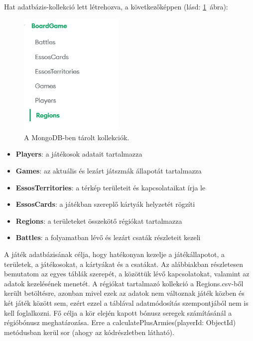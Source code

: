 \documentclass[
]{thesis-ekf}
\theoremstyle{definition}
\theoremstyle{remark}
\begin{document}
	
	
	Hat adatbázis-kollekció lett létrehozva, a következőképpen (lásd: \ref{collections}~ábra):
	
	\begin{figure}[ht!]
		\centering
		\includegraphics[width=5cm]{Collections.png}
		\caption{A MongoDB-ben tárolt kollekciók.}
		\label{collections}
	\end{figure}
	
	\begin{itemize}
		\item \textbf{Players}: a játékosok adatait tartalmazza
		\item \textbf{Games}: az aktuális és lezárt játszmák állapotát tartalmazza
		\item \textbf{EssosTerritories}: a térkép területeit és kapcsolataikat írja le
		\item \textbf{EssosCards}: a játékban szereplő kártyák helyzetét rögzíti
		\item \textbf{Regions}: a területeket összekötő régiókat tartalmazza
		\item \textbf{Battles}: a folyamatban lévő és lezárt csaták részleteit kezeli
	\end{itemize}
	
	A játék adatbázisának célja, hogy hatékonyan kezelje a játékállapotot, a területek, a játékosokat, a kártyákat és a csatákat. Az alábbiakban részletesen bemutatom az egyes táblák szerepét, a közöttük lévő kapcsolatokat, valamint az adatok kezelésének menetét. A régiókat tartalmazó kollekció a Regions.csv-ből került betöltésre, azonban mivel ezek az adatok nem változnak játék közben és két játék között sem, ezért ezzel a táblával adatmódosítás szempontjából nem is kell foglalkozni. Fő célja a kör elején kapott bónusz seregek számításánál a régióbónusz meghatározása. Erre a calculatePlusArmies(playerId: ObjectId) metódusban kerül sor (ahogy az  kódrészletben látható).
	
\end{document}
